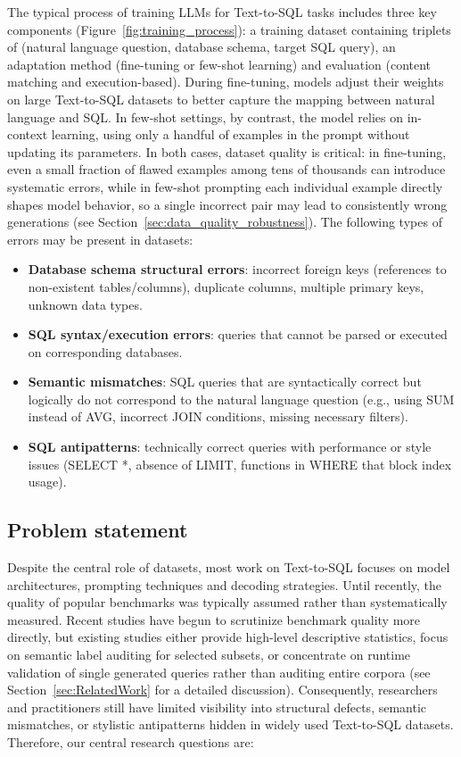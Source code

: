 \documentclass[print]{einformatica}
\begin{document}
The typical process of training LLMs for Text-to-SQL tasks includes three key components (Figure~\ref{fig:training_process}): a training dataset containing triplets of (natural language question, database schema, target SQL query), an adaptation method (fine-tuning or few-shot learning) and evaluation (content matching and execution-based). During fine-tuning, models adjust their weights on large Text-to-SQL datasets to better capture the mapping between natural language and SQL. In few-shot settings, by contrast, the model relies on in-context learning, using only a handful of examples in the prompt without updating its parameters. In both cases, dataset quality is critical: in fine-tuning, even a small fraction of flawed examples among tens of thousands can introduce systematic errors, while in few-shot prompting each individual example directly shapes model behavior, so a single incorrect pair may lead to consistently wrong generations (see Section~\ref{sec:data_quality_robustness}). The following types of errors may be present in datasets:

\begin{itemize}
\item \textbf{Database schema structural errors}: incorrect foreign keys (references to non-existent tables/columns), duplicate columns, multiple primary keys, unknown data types.
\item \textbf{SQL syntax/execution errors}: queries that cannot be parsed or executed on corresponding databases.
\item \textbf{Semantic mismatches}: SQL queries that are syntactically correct but logically do not correspond to the natural language question (e.g., using SUM instead of AVG, incorrect JOIN conditions, missing necessary filters).
\item \textbf{SQL antipatterns}: technically correct queries with performance or style issues (SELECT *, absence of LIMIT, functions in WHERE that block index usage).
\end{itemize}

\subsection*{Problem statement}
Despite the central role of datasets, most work on Text-to-SQL focuses on model architectures, prompting techniques and decoding strategies. Until recently, the quality of popular benchmarks was typically assumed rather than systematically measured. Recent studies have begun to scrutinize benchmark quality more directly, but existing studies either provide high-level descriptive statistics, focus on semantic label auditing for selected subsets, or concentrate on runtime validation of single generated queries rather than auditing entire corpora (see Section~\ref{sec:RelatedWork} for a detailed discussion). Consequently, researchers and practitioners still have limited visibility into structural defects, semantic mismatches, or stylistic antipatterns hidden in widely used Text-to-SQL datasets. Therefore, our central research questions are:
\end{document}
